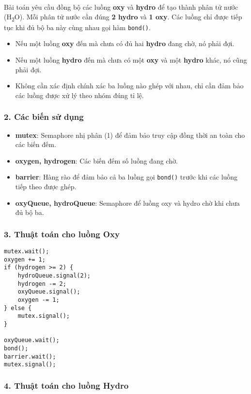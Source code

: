 Bài toán yêu cầu đồng bộ các luồng \textbf{oxy} và \textbf{hydro} để tạo thành phân tử nước (H\textsubscript{2}O). Mỗi phân tử nước cần đúng \textbf{2 hydro} và \textbf{1 oxy}. Các luồng chỉ được tiếp tục khi đủ bộ ba này cùng nhau gọi hàm \texttt{bond()}.

\begin{itemize}
  \item Nếu một luồng \textbf{oxy} đến mà chưa có đủ hai \textbf{hydro} đang chờ, nó phải đợi.
  \item Nếu một luồng \textbf{hydro} đến mà chưa có một \textbf{oxy} và một \textbf{hydro} khác, nó cũng phải đợi.
  \item Không cần xác định chính xác ba luồng nào ghép với nhau, chỉ cần đảm bảo các luồng được xử lý theo nhóm đúng tỉ lệ.
\end{itemize}

\subsubsection*{2. Các biến sử dụng}

\begin{itemize}
  \item \textbf{mutex}: Semaphore nhị phân (1) để đảm bảo truy cập đồng thời an toàn cho các biến đếm.
  \item \textbf{oxygen, hydrogen}: Các biến đếm số luồng đang chờ.
  \item \textbf{barrier}: Hàng rào để đảm bảo cả ba luồng gọi \texttt{bond()} trước khi các luồng tiếp theo được ghép.
  \item \textbf{oxyQueue, hydroQueue}: Semaphore để luồng oxy và hydro chờ khi chưa đủ bộ ba.
\end{itemize}

\subsubsection*{3. Thuật toán cho luồng Oxy}

\begin{lstlisting}
mutex.wait();
oxygen += 1;
if (hydrogen >= 2) {
    hydroQueue.signal(2);
    hydrogen -= 2;
    oxyQueue.signal();
    oxygen -= 1;
} else {
    mutex.signal();
}

oxyQueue.wait();
bond();
barrier.wait();
mutex.signal();
\end{lstlisting}

\subsubsection*{4. Thuật toán cho luồng Hydro}

